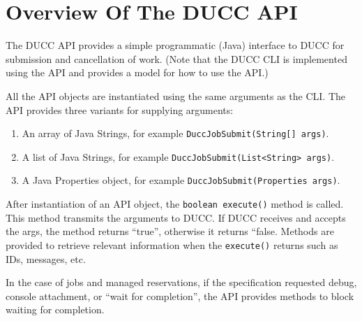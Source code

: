 % 
% 
% 
% 
\section{Overview Of The DUCC API}

   The DUCC API provides a simple programmatic (Java) interface to DUCC for submission and
   cancellation of work.  (Note that the DUCC CLI is implemented using the API and provides a
   model for how to use the API.)

   All the API objects are instantiated using the same arguments as the CLI.  The API
   provides three variants for supplying arguments:
   \begin{enumerate}
     \item An array of Java Strings, for example {\tt DuccJobSubmit(String[] args)}.
     \item A list of Java Strings,   for example {\tt DuccJobSubmit(List<String> args)}.
     \item A Java Properties object, for example {\tt DuccJobSubmit(Properties args)}.
   \end{enumerate}

   After instantiation of an API object, the {\tt boolean execute()} method is called.  This
   method transmits the arguments to DUCC.  If DUCC receives and accepts the args, the method
   returns ``true'', otherwise it returns ``false.  Methods are provided to retrieve relevant
   information when the {\tt execute()} returns such as IDs, messages, etc.

   In the case of jobs and managed reservations, if the specification requested debug,
   console attachment, or ``wait for completion'', the API provides methods to block
   waiting for completion.

